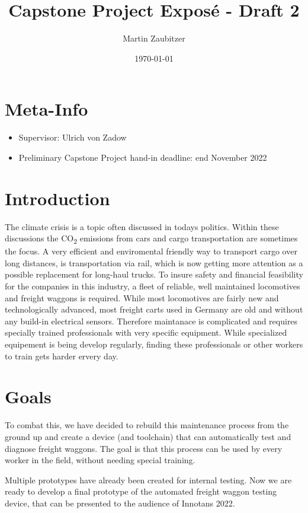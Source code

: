 \documentclass[a4paper,12pt]{article}
\title{Capstone Project Exposé - Draft 2}
\author{Martin Zaubitzer }
\date{\today}
\begin{document}
\maketitle

\section*{Meta-Info}
\begin{itemize}
    \item Supervisor: Ulrich von Zadow
    \item Preliminary Capstone Project hand-in deadline: end November 2022
\end{itemize}

\section*{Introduction}
The climate crisis is a topic often discussed in todays politics. Within these discussions the CO\textsubscript{2} emissions from cars and cargo transportation are sometimes the focus. A very efficient and enviromental friendly way to transport cargo over long distances, is transportation via rail, which is now getting more attention as a possible replacement for long-haul trucks. To insure safety and financial feasibility for the companies in this industry, a fleet of reliable, well maintained locomotives and freight waggons is required. While most locomotives are fairly new and technologically advanced, most freight carts used in Germany are old and without any build-in electrical sensors. Therefore maintanace is complicated and requires specially trained professionals with very specific equipment. While specialized equipement is being develop regularly, finding these professionals or other workers to train gets harder ervery day.

\section*{Goals}
To combat this, we have decided to rebuild this maintenance process from the ground up and create a device (and toolchain) that can automatically test and diagnose freight waggons. The goal is that this process can be used by every worker in the field, without needing special training.

\noindent
Multiple prototypes have already been created for internal testing. Now we are ready to develop a final prototype of the automated freight waggon testing device, that can be presented to the audience of Innotans 2022.
\end{document}
